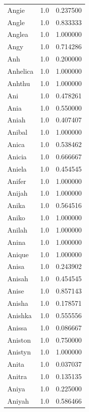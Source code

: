 \documentclass[
  letterpaper,
  DIV=11,
  numbers=noendperiod]{scrreprt}
\begin{document}
\begin{tabular}{lrr}
Angie           &   1.0 &   0.237500 \\
Angle           &   1.0 &   0.833333 \\
Anglea          &   1.0 &   1.000000 \\
Angy            &   1.0 &   0.714286 \\
Anh             &   1.0 &   0.200000 \\
Anhelica        &   1.0 &   1.000000 \\
Anhthu          &   1.0 &   1.000000 \\
Ani             &   1.0 &   0.478261 \\
Ania            &   1.0 &   0.550000 \\
Aniah           &   1.0 &   0.407407 \\
Anibal          &   1.0 &   1.000000 \\
Anica           &   1.0 &   0.538462 \\
Anicia          &   1.0 &   0.666667 \\
Aniela          &   1.0 &   0.454545 \\
Anifer          &   1.0 &   1.000000 \\
Anijah          &   1.0 &   1.000000 \\
Anika           &   1.0 &   0.564516 \\
Aniko           &   1.0 &   1.000000 \\
Anilah          &   1.0 &   1.000000 \\
Anina           &   1.0 &   1.000000 \\
Anique          &   1.0 &   1.000000 \\
Anisa           &   1.0 &   0.243902 \\
Anisah          &   1.0 &   0.454545 \\
Anise           &   1.0 &   0.857143 \\
Anisha          &   1.0 &   0.178571 \\
Anishka         &   1.0 &   0.555556 \\
Anissa          &   1.0 &   0.086667 \\
Aniston         &   1.0 &   0.750000 \\
Anistyn         &   1.0 &   1.000000 \\
Anita           &   1.0 &   0.037037 \\
Anitra          &   1.0 &   0.135135 \\
Aniya           &   1.0 &   0.225000 \\
Aniyah          &   1.0 &   0.586466 \\

\end{tabular}
\end{document}
